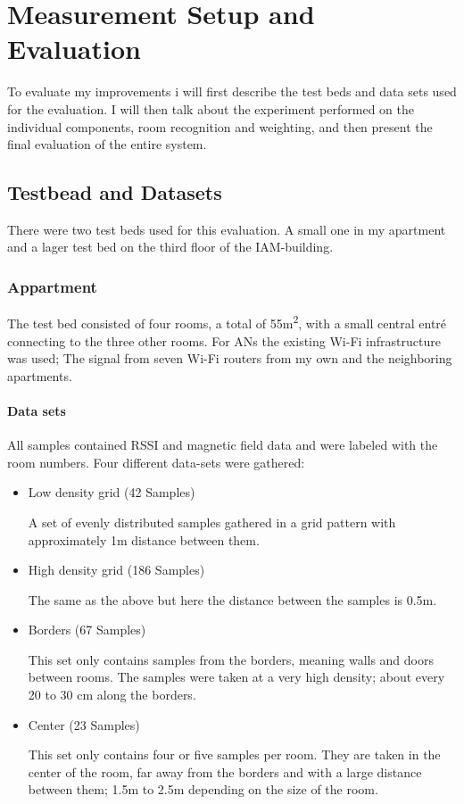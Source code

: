 \chapter{Measurement Setup and Evaluation}

\label{Chapter4}

To evaluate my improvements i will first describe the test beds and data sets used for the evaluation. I will then talk about the experiment performed on the individual components, room recognition and weighting, and then present the final evaluation of the entire system.

\section{Testbead and Datasets}

There were two test beds used for this evaluation. A small one in my apartment and a lager test bed on the third floor of the IAM-building.

\subsection{Appartment}
The test bed consisted of four rooms, a total of 55m\textsuperscript{2}, with a small central entré connecting to the three other rooms. For ANs the existing Wi-Fi infrastructure was used; The signal from seven Wi-Fi routers from my own and the neighboring apartments. 

\subsubsection{Data sets}
All samples contained RSSI and magnetic field data and were labeled with the room numbers. Four different data-sets were gathered:
\begin{itemize}
\item Low density grid (42 Samples)

A set of evenly distributed samples gathered in a grid pattern with approximately 1m distance between them.

\item High density grid (186 Samples)

The same as the above but here the distance between the samples is 0.5m.
\item Borders (67 Samples)

This set only contains samples from the borders, meaning walls and doors between rooms. The samples were taken at a very high density; about every 20 to 30 cm along the borders.
\item Center (23 Samples)

This set only contains four or five samples per room. They are taken in the center of the room, far away from the borders and with a large distance between them; 1.5m to 2.5m depending on the size of the room.
\end{itemize}


